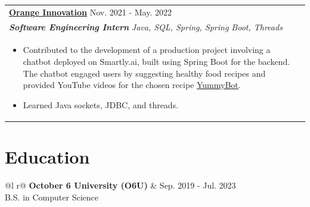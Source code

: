 \documentclass[a4paper,10pt]{article}
\begin{document}
    \begin{tabularx}{\linewidth}{ @{}l r@{} }
\color[HTML]{1C033C} \textbf{\uline{\href{https://www.linkedin.com/company/orangele/}{Orange Innovation}}} \hfill \color[HTML]{371e77} Nov. 2021 - May. 2022 \\[4pt]
\color[HTML]{371e77}\textbf{\textit{Software Engineering Intern}} \hfill \color[HTML]{4B28A4} \textit{Java, SQL, Spring, Spring Boot, Threads} \\[5pt]
\begin{minipage}[t]{\linewidth}
    \begin{itemize}[nosep,after=\strut, leftmargin=2em, itemsep=2pt]
        \item Contributed to the development of a production project involving a chatbot deployed on Smartly.ai, built using Spring Boot for the backend. The chatbot engaged users by suggesting healthy food recipes and provided YouTube videos for the chosen recipe {\uline{\href{https://github.com/AdhamMadkour/YummyBot}{YummyBot}}}.
        \item
        Learned Java sockets, JDBC, and threads.
    \end{itemize}
\end{minipage}
    \end{tabularx}


    \section{Education}
    \begin{tabularx}{\linewidth}{ @{}l r@{} }
\color[HTML]{1C033C} \textbf{October 6 University (O6U)} & \hfill \color[HTML]{371e77} Sep. 2019 - Jul. 2023 \\
\color[HTML]{371e77} B.S. in Computer Science \\
    \end{tabularx}

\end{document}
